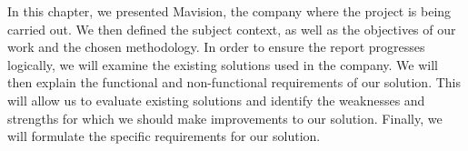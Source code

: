 In this chapter, we presented Mavision, the company where the project is being
carried out. We then defined the subject context, as well as the objectives of our
work and the chosen methodology. In order to ensure the report progresses logically,
we will examine the existing solutions used in the company. We will then explain the
functional and non-functional requirements of our solution. This will allow us to
evaluate existing solutions and identify the weaknesses and strengths for which we
should make improvements to our solution. Finally, we will formulate the specific
requirements for our solution.

	
	
	
